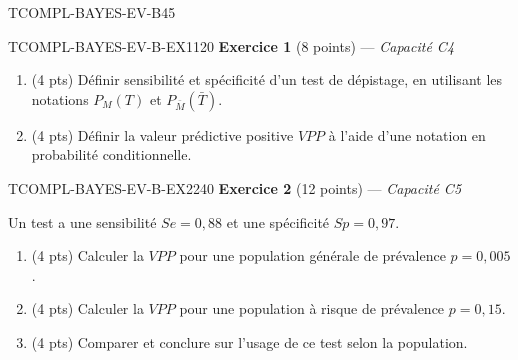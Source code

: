 

\begin{evaluation}{TCOMPL-BAYES-EV-B}{45}

\begin{exercice}{TCOMPL-BAYES-EV-B-EX1}{1}{20}
\textbf{Exercice 1} (8 points) --- \textit{Capacité C4}

\medskip

\begin{enumerate}
  \item (4 pts) Définir sensibilité et spécificité d'un test de dépistage, en utilisant les notations $P_M(T)$ et $P_{\bar M}(\bar T)$.
  \item (4 pts) Définir la valeur prédictive positive $VPP$ à l'aide d'une notation en probabilité conditionnelle.
\end{enumerate}
\end{exercice}

\begin{exercice}{TCOMPL-BAYES-EV-B-EX2}{2}{40}
\textbf{Exercice 2} (12 points) --- \textit{Capacité C5}

\medskip

Un test a une sensibilité $Se=0{,}88$ et une spécificité $Sp=0{,}97$.
\begin{enumerate}
  \item (4 pts) Calculer la $VPP$ pour une population générale de prévalence $p=0{,}005$.
  \item (4 pts) Calculer la $VPP$ pour une population à risque de prévalence $p=0{,}15$.
  \item (4 pts) Comparer et conclure sur l'usage de ce test selon la population.
\end{enumerate}
\end{exercice}

\end{evaluation}

